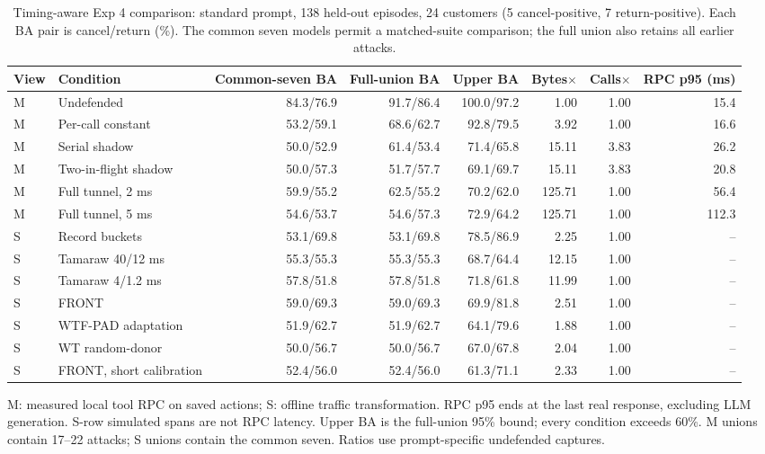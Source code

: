 \begin{table}[t]\centering\footnotesize
\caption{Timing-aware Exp 4 comparison: standard prompt, 138 held-out episodes, 24 customers (5 cancel-positive, 7 return-positive). Each BA pair is cancel/return (\%). The common seven models permit a matched-suite comparison; the full union also retains all earlier attacks.}\label{tab:r7-controls}
\begin{tabular}{@{}llrrrrrr@{}}\toprule
View & Condition & Common-seven BA & Full-union BA & Upper BA & Bytes$\times$ & Calls$\times$ & RPC p95 (ms)\\\midrule
M & Undefended & 84.3/76.9 & 91.7/86.4 & 100.0/97.2 & 1.00 & 1.00 & 15.4\\
M & Per-call constant & 53.2/59.1 & 68.6/62.7 & 92.8/79.5 & 3.92 & 1.00 & 16.6\\
M & Serial shadow & 50.0/52.9 & 61.4/53.4 & 71.4/65.8 & 15.11 & 3.83 & 26.2\\
M & Two-in-flight shadow & 50.0/57.3 & 51.7/57.7 & 69.1/69.7 & 15.11 & 3.83 & 20.8\\
M & Full tunnel, 2 ms & 59.9/55.2 & 62.5/55.2 & 70.2/62.0 & 125.71 & 1.00 & 56.4\\
M & Full tunnel, 5 ms & 54.6/53.7 & 54.6/57.3 & 72.9/64.2 & 125.71 & 1.00 & 112.3\\
\midrule
S & Record buckets & 53.1/69.8 & 53.1/69.8 & 78.5/86.9 & 2.25 & 1.00 & --\\
S & Tamaraw 40/12 ms & 55.3/55.3 & 55.3/55.3 & 68.7/64.4 & 12.15 & 1.00 & --\\
S & Tamaraw 4/1.2 ms & 57.8/51.8 & 57.8/51.8 & 71.8/61.8 & 11.99 & 1.00 & --\\
S & FRONT & 59.0/69.3 & 59.0/69.3 & 69.9/81.8 & 2.51 & 1.00 & --\\
S & WTF-PAD adaptation & 51.9/62.7 & 51.9/62.7 & 64.1/79.6 & 1.88 & 1.00 & --\\
S & WT random-donor & 50.0/56.7 & 50.0/56.7 & 67.0/67.8 & 2.04 & 1.00 & --\\
S & FRONT, short calibration & 52.4/56.0 & 52.4/56.0 & 61.3/71.1 & 2.33 & 1.00 & --\\
\bottomrule\end{tabular}
\par\smallskip\raggedright M: measured local tool RPC on saved actions; S: offline traffic transformation. RPC p95 ends at the last real response, excluding LLM generation. S-row simulated spans are not RPC latency. Upper BA is the full-union 95\% bound; every condition exceeds 60\%. M unions contain 17--22 attacks; S unions contain the common seven. Ratios use prompt-specific undefended captures.
\end{table}
